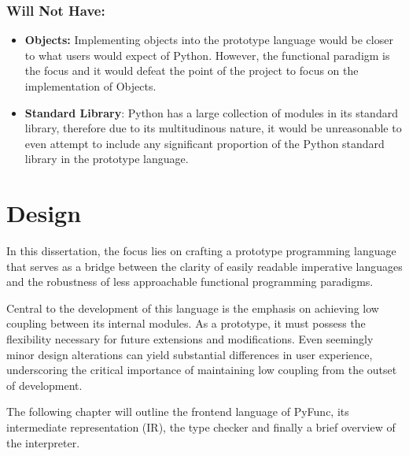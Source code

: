 \documentclass{l4proj}
\begin{document}
\subsection*{Will Not Have:}
\begin{itemize}
    \item \textbf{Objects:} Implementing objects into the prototype language would be closer to what users would expect of Python. However, the functional paradigm is the focus and it would defeat the point of the project to focus on the implementation of Objects.
    \item \textbf{Standard Library}: Python has a large collection of modules in its standard library, therefore due to its multitudinous nature, it would be unreasonable to even attempt to include any significant proportion of the Python standard library in the prototype language. 
\end{itemize}


\chapter{Design}


In this dissertation, the focus lies on crafting a prototype programming language that serves as a bridge between the clarity of easily readable imperative languages and the robustness of less approachable functional programming paradigms.

Central to the development of this language is the emphasis on achieving low coupling between its internal modules.
As a prototype, it must possess the flexibility necessary for future extensions and modifications.
Even seemingly minor design alterations can yield substantial differences in user experience, underscoring the critical importance of maintaining low coupling from the outset of development.

The following chapter will outline the frontend language of PyFunc, its intermediate representation (IR), the type checker and finally a brief overview of the interpreter.
\end{document}
